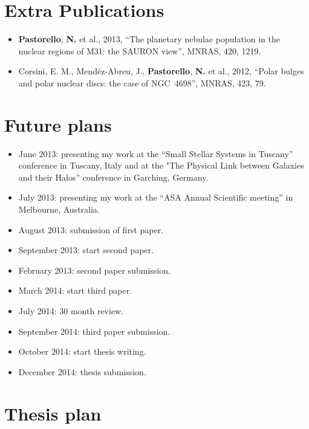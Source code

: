 \section{Extra Publications}
	\begin{itemize}
	\item{\textbf{Pastorello}, \textbf{N.} et al., 2013}, ``The planetary nebulae population in the nuclear regions of M31: the SAURON view'', MNRAS, 420, 1219.
	\item{Corsini, E. M., Mend\'ez-Abreu, J., \textbf{Pastorello}, \textbf{N.} et al., 2012}, ``Polar bulges and polar nuclear discs: the case of NGC~4698'', MNRAS, 423, 79.	
\end{itemize}		



\section{Future plans}
\begin{itemize}
\item{June 2013:} presenting my work at the ``Small Stellar Systems in Tuscany'' conference in Tuscany, Italy and at the 
                     "The Physical Link between Galaxies and their Halos'' conference in Garching, Germany. 
\item{July 2013:} presenting my work at the ``ASA Annual Scientific meeting'' in Melbourne, Australia.
\item{August 2013:} submission of first paper.
\item{September 2013:} start second paper.
\item{February 2013:} second paper submission.
\item{March 2014:} start third paper.
\item{July 2014:} 30 month review. 
\item{September 2014:} third paper submission.
\item{October 2014:} start thesis writing.
\item{December 2014:} thesis submission.

\end{itemize}

\section{Thesis plan}

